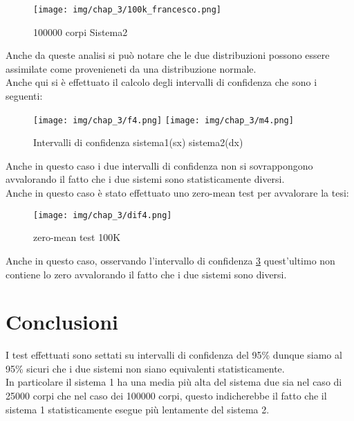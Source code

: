 \begin{figure}[H]
    \centering
    \texttt{[image: img/chap\_3/100k\_francesco.png]}
    \caption{100000 corpi Sistema2}
    \label{fig:sis_2_100_k}
\end{figure}
\noindent
Anche da queste analisi si può notare che le due distribuzioni possono essere assimilate come provenieneti da una distribuzione normale.\\
Anche qui si è effettuato il calcolo degli intervalli di confidenza che sono i seguenti:\\
\begin{figure}[H]
    \centering
    \texttt{[image: img/chap\_3/f4.png]}
    \texttt{[image: img/chap\_3/m4.png]}
    \caption{Intervalli di confidenza sistema1(sx) sistema2(dx)}
    \label{fig:sis_2_25_k}
\end{figure}
\noindent
Anche in questo caso i due intervalli di confidenza non si sovrappongono avvalorando il fatto che i due sistemi sono statisticamente diversi.\\
Anche in questo caso è stato effettuato uno zero-mean test per avvalorare la tesi:
\begin{figure}[H]
    \centering
    \texttt{[image: img/chap\_3/dif4.png]}
    \caption{zero-mean test 100K}
    \label{fig:z_m2}
\end{figure}
\noindent
Anche in questo caso, osservando l'intervallo di confidenza \ref{fig:z_m2} quest'ultimo non contiene lo zero avvalorando il fatto che i due sistemi sono diversi.
\section{Conclusioni}
I test effettuati sono settati su intervalli di confidenza del 95\% dunque siamo al 95\% sicuri che i due sistemi non siano equivalenti statisticamente.\\
In particolare il sistema 1 ha una media più alta del sistema due sia nel caso di 25000 corpi che nel caso dei 100000 corpi, questo indicherebbe il fatto che il sistema 1 statisticamente esegue più lentamente del sistema 2.
